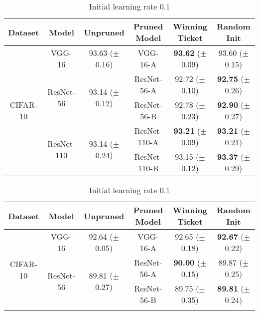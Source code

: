 \setlength{\tabcolsep}{4pt}
\renewcommand{\arraystretch}{1.15}
\begin{table}[!htbp]
\begin{subtable}[b]{\textwidth}
\centering
\small
\begin{tabular}{c|ccccc}
\hline
Dataset                   & Model                       & Unpruned                     & Pruned Model & Winning Ticket & Random Init \\ \hline
\multirow{5}{*}{CIFAR-10} & VGG-16                      & 93.63 ($\pm$0.16)                  & VGG-16-A     & \textbf{93.62} ($\pm$0.09)  & 93.60 ($\pm$0.15) \\ \cline{2-6} 
                          & \multirow{2}{*}{ResNet-56}  & \multirow{2}{*}{93.14 ($\pm$0.12)} & ResNet-56-A  & 92.72 ($\pm$0.10)  & \textbf{92.75} ($\pm$0.26) \\
                          &                             &                              & ResNet-56-B  & 92.78 ($\pm$0.23)  & \textbf{92.90} ($\pm$0.27) \\ \cline{2-6} 
                          & \multirow{2}{*}{ResNet-110} & \multirow{2}{*}{93.14 ($\pm$0.24)} & ResNet-110-A & \textbf{93.21} ($\pm$0.09)  & \textbf{93.21} ($\pm$0.21) \\
                          &                             &                              & ResNet-110-B & 93.15 ($\pm$0.12)  & \textbf{93.37} ($\pm$0.29) \\ \hline
\end{tabular}
\caption{Initial learning rate 0.1}
\end{subtable}
\begin{subtable}[b]{\textwidth}
\centering
\small
\begin{tabular}{c|ccccc}
\hline
Dataset                   & Model                       & Unpruned                     & Pruned Model & Winning Ticket & Random Init \\ \hline
\multirow{5}{*}{CIFAR-10} & VGG-16                      &        92.64 ($\pm$0.05)           & VGG-16-A     & 92.65 ($\pm$0.18)  & \textbf{92.67} ($\pm$0.22) \\ \cline{2-6} 
                          & \multirow{2}{*}{ResNet-56}  & \multirow{2}{*}{89.81  ($\pm$0.27)} & ResNet-56-A  & \textbf{90.00} ($\pm$0.15)  & 89.87 ($\pm$0.25) \\
                          &                             &                              & ResNet-56-B  & 89.75 ($\pm$0.35)  & \textbf{89.81} ($\pm$0.24) \\ \cline{2-6} 

\end{tabular}
\end{subtable}
\end{table}
